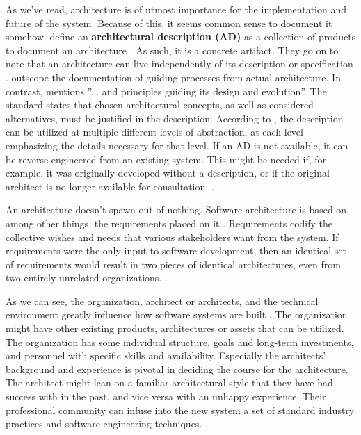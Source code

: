 \documentclass[utf8,english]{gradu3}
\begin{document}
As we've read, architecture is of utmost importance for the implementation and
future of the system. Because of this, it seems common sense to document
it somehow. \textcite[24]{Bass1998} define an \textbf{architectural description (AD)} as a
collection of products to document an architecture \parencite[3]{IEEE42010}. As such, it
is a concrete artifact. They go on to note that an architecture can live
independently of its description or specification \parencite[24]{Bass1998}. \textcite[27]{Bass1998}
outscope the documentation of guiding processes from actual architecture.  In
contrast, \textcite[3]{IEEE42010} mentions ''... and principles guiding its design and
evolution''. The standard states that chosen architectural concepts, as well as
considered alternatives, must be justified in the description. According to
\textcite[67]{IEEE12207}, the description can be utilized at multiple different levels of
abstraction, at each level emphasizing the details necessary for that level. If
an AD is not available, it can be reverse-engineered from an existing system.
This might be needed if, for example, it was originally developed without a
description, or if the original architect is no longer available for
consultation. \parencite[7]{IEEE42010}.

An architecture doesn't spawn out of nothing. Software architecture is based on,
among other things, the requirements placed on it \parencite{Bass1998}. Requirements
codify the collective wishes and needs that various stakeholders want from the
system. If requirements were the only input to software development, then an
identical set of requirements would result in two pieces of identical
architectures, even from two entirely unrelated organizations. \parencite[5-9]{Bass1998}.

As we can see, the organization, architect or architects, and the technical
environment greatly influence how software systems are built \parencite{Bass1998}. The
organization might have other existing products, architectures or assets that
can be utilized. The organization has some individual structure, goals and
long-term investments, and personnel with specific skills and availability.
Especially the architects' background and experience is pivotal in deciding the
course for the architecture. The architect might lean on a familiar
architectural style that they have had success with in the past, and vice versa
with an unhappy experience. Their professional community can infuse into the new
system a set of standard industry practices and software engineering techniques.
\parencite[5-9]{Bass1998}.
\end{document}
